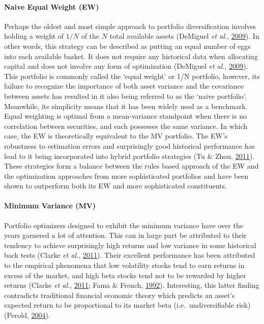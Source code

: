 \documentclass[11pt,preprint, authoryear]{elsarticle}
\numberwithin{equation}{section}
\numberwithin{figure}{section}
\numberwithin{table}{section}
\begin{document}
\hypertarget{naive-equal-weight-ew}{%
\paragraph{Naive Equal Weight (EW)}\label{naive-equal-weight-ew}}

Perhaps the oldest and most simple approach to portfolio diversification
involves holding a weight of \(1/N\) of the \(N\) total available assets
(DeMiguel \emph{et al.}, \protect\hyperlink{ref-demiguel2009}{2009}). In
other words, this strategy can be described as putting an equal number
of eggs into each available basket. It does not require any historical
data when allocating capital and does not involve any form of
optimization (DeMiguel \emph{et al.},
\protect\hyperlink{ref-demiguel2009}{2009}). This portfolio is commonly
called the `equal weight' or 1/N portfolio, however, its failure to
recognize the importance of both asset variance and the covariance
between assets has resulted in it also being referred to as the `naive
portfolio'. Meanwhile, its simplicity means that it has been widely used
as a benchmark. Equal weighting is optimal from a mean-variance
standpoint when there is no correlation between securities, and each
possesses the same variance. In which case, the EW is theoretically
equivalent to the MV portfolio. The EW's robustness to estimation errors
and surprisingly good historical performance has lead to it being
incorporated into hybrid portfolio strategies (Tu \& Zhou,
\protect\hyperlink{ref-tu2011}{2011}). These strategies form a balance
between the rules based approach of the EW and the optimization
approaches from more sophisticated portfolios and have been shown to
outperform both its EW and more sophisticated constituents.

\hypertarget{minimum-variance-mv}{%
\paragraph{Minimum Variance (MV)}\label{minimum-variance-mv}}

Portfolio optimizers designed to exhibit the minimum variance have over
the years garnered a lot of attention. This can in large part be
attributed to their tendency to achieve surprisingly high returns and
low variance in some historical back tests (Clarke \emph{et al.},
\protect\hyperlink{ref-clarke2011}{2011}). Their excellent performance
has been attributed to the empirical phenomena that low volatility
stocks tend to earn returns in excess of the market, and high beta
stocks tend not to be rewarded by higher returns (Clarke \emph{et al.},
\protect\hyperlink{ref-clarke2011}{2011}; Fama \& French,
\protect\hyperlink{ref-fama1992}{1992}). Interesting, this latter
finding contradicts traditional financial economic theory which predicts
an asset's expected return to be proportional to its market beta
(i.e.~undiversifiable risk) (Perold,
\protect\hyperlink{ref-perold2004}{2004}).
\end{document}

